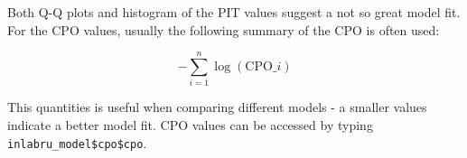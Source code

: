 \documentclass[
  letterpaper,
  DIV=11,
  numbers=noendperiod]{scrartcl}
\newenvironment{Shaded}{\begin{snugshade}}{\end{snugshade}}
\newcommand{\AttributeTok}[1]{\textcolor[rgb]{0.40,0.45,0.13}{#1}}
\newcommand{\ControlFlowTok}[1]{\textcolor[rgb]{0.00,0.23,0.31}{\textbf{#1}}}
\newcommand{\FloatTok}[1]{\textcolor[rgb]{0.68,0.00,0.00}{#1}}
\newcommand{\FunctionTok}[1]{\textcolor[rgb]{0.28,0.35,0.67}{#1}}
\newcommand{\NormalTok}[1]{\textcolor[rgb]{0.00,0.23,0.31}{#1}}
\newcommand{\SpecialCharTok}[1]{\textcolor[rgb]{0.37,0.37,0.37}{#1}}
\newcommand{\StringTok}[1]{\textcolor[rgb]{0.13,0.47,0.30}{#1}}
\begin{document}
\begin{Shaded}
\end{Shaded}

Both Q-Q plots and histogram of the PIT values suggest a not so great
model fit. For the CPO values, usually the following summary of the CPO
is often used:

\[
-\sum_{i=1}^n \log (\text{CPO}\_i)
\]

This quantities is useful when comparing different models - a smaller
values indicate a better model fit. CPO values can be accessed by typing
\texttt{inlabru\_model\$cpo\$cpo}.
\end{document}
